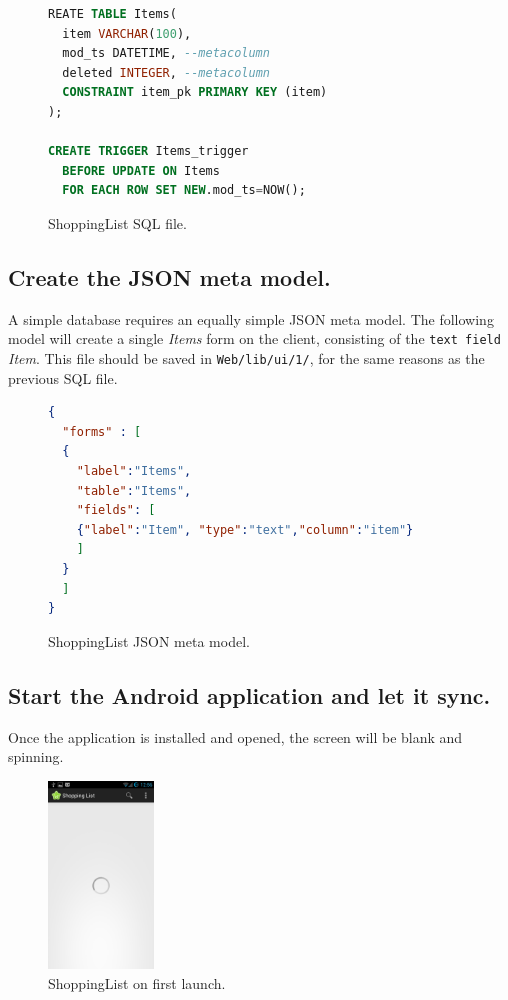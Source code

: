 \begin{figure}[h!]
\begin{lstlisting}[language=sql]
REATE TABLE Items(
  item VARCHAR(100),
  mod_ts DATETIME, --metacolumn
  deleted INTEGER, --metacolumn
  CONSTRAINT item_pk PRIMARY KEY (item)
);

CREATE TRIGGER Items_trigger 
  BEFORE UPDATE ON Items 
  FOR EACH ROW SET NEW.mod_ts=NOW();
\end{lstlisting}
\caption{ShoppingList SQL file.}
\label{fig:shoppinglist_SQL}
\end{figure}




\subsection{Create the JSON meta model.}  \label{sec:}

A simple database requires an equally simple JSON meta model. The following
model will create a single \textit{Items} form on the client, consisting of the
\texttt{text field} \textit{Item}. This file should be saved in
\texttt{Web/lib/ui/1/}, for the same reasons as the previous SQL file.

\begin{figure}[h!]
\begin{lstlisting}[language=json]
{
  "forms" : [
  { 
    "label":"Items",
    "table":"Items",
    "fields": [
    {"label":"Item", "type":"text","column":"item"}
    ]
  }
  ]
}
\end{lstlisting}
\caption{ShoppingList JSON meta model.}
\label{fig:shoppinglist_json}
\end{figure}













\subsection{Start the Android application and let it sync.}  \label{sec:}

Once the application is installed and opened, the screen will be blank and spinning. 


\begin{figure}[h!]
\centering
\includegraphics[width=0.25\textwidth]{images/new.png}
\caption{ShoppingList on first launch.}
\label{fig:first_launch}
\end{figure}

